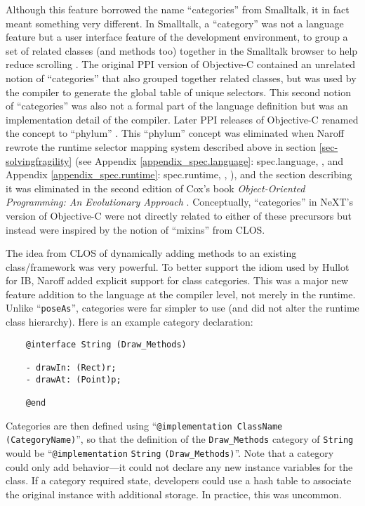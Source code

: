 \documentclass[acmsmall,screen]{acmart}
\begin{document}
Although this feature borrowed the name ``categories'' from Smalltalk, it in fact meant something very different. In Smalltalk, a ``category'' was not a language feature but a user interface feature of the development environment, to group a set of related classes (and methods too) together in the Smalltalk browser to help reduce scrolling \citetext{\citealp[122, 124]{tesler_smalltalk_1981}; \citealp[18]{tesler_oral_2013}}. The original PPI version of Objective-C contained an unrelated notion of ``categories'' that also grouped together related classes, but was used by the compiler to generate the global table of unique selectors. This second notion of ``categories'' was also not a formal part of the language definition but was an implementation detail of the compiler. Later PPI releases of Objective-C renamed the concept to ``phylum'' \citetext{\citealp[84--88]{cox_object-oriented_1986}, see also Appendix \ref{appendix_spec.runtime}: spec.runtime, }. This ``phylum'' concept was eliminated when Naroff rewrote the runtime selector mapping system described above in section \ref{sec-solvingfragility} (see Appendix \ref{appendix_spec.language}: spec.language, , and Appendix \ref{appendix_spec.runtime}: spec.runtime, , ), and the section describing it was eliminated in the second edition of Cox's book \emph{Object-Oriented Programming: An Evolutionary Approach} \citep[88--89]{cox_object-oriented_1991}. Conceptually, ``categories'' in NeXT's version of Objective-C were not directly related to either of these precursors but instead were inspired by the notion of ``mixins'' from CLOS.

The idea from CLOS of dynamically adding methods to an existing class/framework was very powerful. To better support the idiom used by Hullot for IB, Naroff added explicit support for class categories. This was a major new feature addition to the language at the compiler level, not merely in the runtime. Unlike ``\verb$poseAs$'', categories were far simpler to use (and did not alter the runtime class hierarchy). Here is an example category declaration:
\begin{verbatim}
    @interface String (Draw_Methods)

    - drawIn: (Rect)r; 
    - drawAt: (Point)p; 

    @end
\end{verbatim}
Categories are then defined using ``\verb$@implementation ClassName (CategoryName)$'', so that the definition of the \verb$Draw_Methods$ category of \verb$String$ would be ``\verb$@implementation$ \verb$String$ \verb$(Draw_Methods)$''. Note that a category could only add behavior---it could not declare any new instance variables for the class. If a category required state, developers could use a hash table to associate the original instance with additional storage. In practice, this was uncommon.
\end{document}
